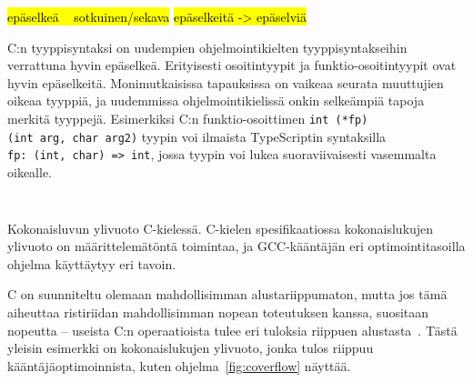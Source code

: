 \hl{epäselkeä ~ sotkuinen/sekava}
\hl{epäselkeitä -> epäselviä}

C:n tyyppisyntaksi on uudempien ohjelmointikielten tyyppisyntakseihin
verrattuna hyvin epäselkeä. Erityisesti osoitintyypit ja funktio-osoitintyypit
ovat hyvin epäselkeitä.
Monimutkaisissa tapauksissa on vaikeaa seurata muuttujien oikeaa tyyppiä, ja
uudemmissa ohjelmointikielissä onkin selkeämpiä tapoja merkitä tyyppejä.
Esimerkiksi C:n funktio-osoittimen \texttt{int~(*fp)(int~arg,~char~arg2)}
tyypin voi ilmaista TypeScriptin syntaksilla \texttt{fp:~(int,~char)~=>~int},
jossa tyypin voi lukea suoraviivaisesti vasemmalta oikealle.


\FloatBarrier

\begin{listing}[ht!]
    \inputminted{C}{c-overflow.c}
    \inputminted{text}{c-overflow-output.txt}

    \caption{Kokonaisluvun ylivuoto C-kielessä. C-kielen
    spesifikaatiossa kokonaislukujen ylivuoto on määrittelemätöntä toimintaa,
    ja GCC-kääntäjän eri optimointitasoilla ohjelma käyttäytyy eri tavoin.}
    \label{fig:coverflow}
\end{listing}

\FloatBarrier

C on suunniteltu olemaan mahdollisimman alustariippumaton, mutta jos tämä
aiheuttaa ristiriidan mahdollisimman nopean toteutuksen kanssa, suositaan
nopeutta -- useista C:n operaatioista tulee eri tuloksia riippuen
alustasta~\citep[liite J, luku J.3]{C18}. Tästä yleisin esimerkki on
kokonaislukujen ylivuoto, jonka tulos riippuu kääntäjäoptimoinnista, kuten
ohjelma~\ref{fig:coverflow} näyttää.

